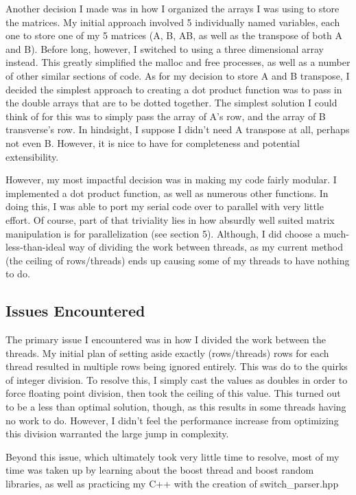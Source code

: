 \documentclass[letterpaper,10pt,titlepage]{article}
\begin{document}
Another decision I made was in how I organized the arrays I was using to store the
matrices. My initial approach involved 5 individually named variables, each one to
store one of my 5 matrices (A, B, AB, as well as the transpose of both A and B).
Before long, however, I switched to using a three dimensional array instead. This
greatly simplified the malloc and free processes, as well as a number of other 
similar sections of code. As for my decision to store A and B transpose, I
decided the simplest approach to creating a dot product function was to 
pass in the double arrays that are to be dotted together. The simplest solution
I could think of for this was to simply pass the array of A's row, and the 
array of B transverse's row. In hindsight, I suppose I didn't need A transpose
at all, perhaps not even B. However, it is nice to have for completeness and 
potential extensibility.

However, my most impactful decision was in making my code fairly modular.
I implemented a dot product function, as well as numerous other functions.
In doing this, I was able to port my serial code over to parallel with 
very little effort. Of course, part of that triviality lies in how absurdly
well suited matrix manipulation is for parallelization (see section 5). 
Although, I did choose a much-less-than-ideal way of dividing the work
between threads, as my current method (the ceiling of rows/threads)
ends up causing some of my threads to have nothing to do. 

\subsection{Issues Encountered}
The primary issue I encountered was in how I divided the work between
the threads. My initial plan of setting aside exactly (rows/threads)
rows for each thread resulted in multiple rows being ignored entirely.
This was do to the quirks of integer division. To resolve this, I simply
cast the values as doubles in order to force floating point division, then
took the ceiling of this value. This turned out to be a less than optimal
solution, though, as this results in some threads having no work to do. 
However, I didn't feel the performance increase from optimizing this division
warranted the large jump in complexity.

Beyond this issue, which ultimately took very little time to resolve, most
of my time was taken up by learning about the boost thread and boost random
libraries, as well as practicing my C++ with the creation of switch\_parser.hpp
\end{document}
